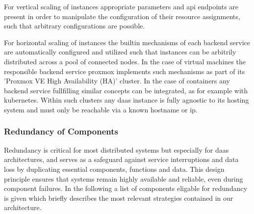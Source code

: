 \documentclass[runningheads]{llncs}
\begin{document}
For vertical scaling of instances appropriate parameters and api endpoints are present
in order to manipulate the configuration of their resource assignments,
such that arbitrary configurations are possible.

For horizontal scaling of instances
the builtin mechanisms of each backend service are automatically configured and utilized
such that instances can be arbitrily distributed across a pool of connected nodes.
In the case of virtual machines the responsible backend service proxmox implements
such mechanisms as part of its 'Proxmox VE High Availability (HA)' cluster.
In the case of containers any backend service fullfilling
similar concepts can be integrated, as for example with kubernetes.
Within such clusters any daas instance is fully agnostic to its hosting system
and must only be reachable via a known hostname or ip.

\subsubsection{Redundancy of Components}

Redundancy is critical for most distributed systems
but especially for daas architectures,
and serves as a safeguard against service interruptions and data loss
by duplicating essential components, functions and data.
This design principle ensures that systems remain highly available and reliable,
even during component failures.
In the following a list of components eligable for redundancy is given
which briefly describes the most relevant strategies contained in our architecture.
\end{document}
